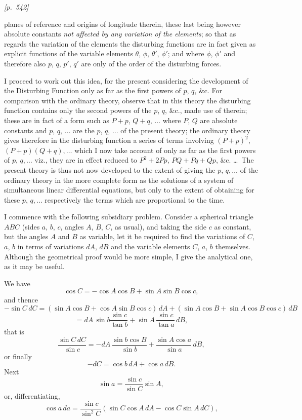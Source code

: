 \documentclass[11pt]{article}
\begin{document}
\newpage
\noindent\textit{[p.~542]}

\medskip

planes of reference and origins of longitude therein, these last being
however absolute constants \textit{not affected by any variation of the
elements}; so that as regards the variation of the elements the
disturbing functions are in fact given as explicit functions of the
variable elements $\theta$, $\phi$, $\theta'$, $\phi'$; and where
$\phi$, $\phi'$ and therefore also $p$, $q$, $p'$, $q'$ are only of the
order of the disturbing forces.

\medskip

I proceed to work out this idea, for the present considering the
development of the Disturbing Function only as far as the first powers
of $p$, $q$, \&c. For comparison with the ordinary theory, observe that
in this theory the disturbing function contains only the second powers
of the $p$, $q$, \&c., made use of therein; these are in fact of a form
such as $P+p$, $Q+q$, $\ldots$ where $P$, $Q$ are absolute constants and
$p$, $q$, $\ldots$ are the $p$, $q$, $\ldots$ of the present theory; the
ordinary theory gives therefore in the disturbing function a series of
terms involving $(P+p)^2$, $(P+p)(Q+q),\ldots$ which I now take account
of only as far as the first powers of $p$, $q,\ldots$ viz., they are in
effect reduced to $P^2+2Pp$, $PQ+Pq+Qp$, \&c. \ldots\ The present theory
is thus not now developed to the extent of giving the $p$, $q,\ldots$ of
the ordinary theory in the more complete form as the solutions of a
system of simultaneous linear differential equations, but only to the
extent of obtaining for these $p$, $q,\ldots$ respectively the terms
which are proportional to the time.

\medskip

I commence with the following subsidiary problem. Consider a spherical
triangle $ABC$ (sides $a$, $b$, $c$, angles $A$, $B$, $C$, as usual),
and taking the side $c$ as constant, but the angles $A$ and $B$ as
variable, let it be required to find the variations of $C$, $a$, $b$ in
terms of variations $dA$, $dB$ and the variable elements $C$, $a$, $b$
themselves. Although the geometrical proof would be more simple, I give
the analytical one, as it may be useful.

\medskip

We have
\[
\cos C=-\cos A\cos B+\sin A\sin B\cos c,
\]
and thence
\[
-\sin C\,dC=(\sin A\cos B+\cos A\sin B\cos c)\,dA+(\sin A\cos B+\sin A\cos B\cos c)\,dB
\]
\[
=dA\,\sin b\frac{\sin c}{\tan b}+\sin A\,\frac{\sin c}{\tan a}\,dB,
\]
that is
\[
\frac{\sin C\,dC}{\sin c}=-dA\,\frac{\sin b\cos B}{\sin b}+\frac{\sin A\cos a}{\sin a}\,dB,
\]
or finally
\[
-dC=\cos b\,dA+\cos a\,dB.
\]
Next
\[
\sin a=\frac{\sin c}{\sin C}\sin A,
\]
or, differentiating,
\[
\cos a\,da=\frac{\sin c}{\sin^2 C}(\sin C\cos A\,dA-\cos C\sin A\,dC),
\]
\end{document}
